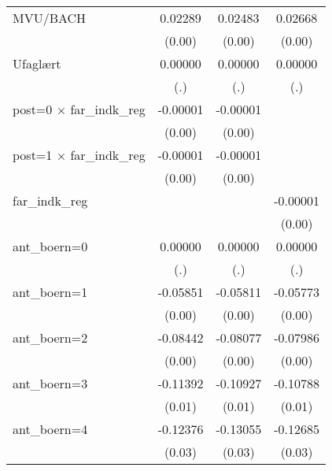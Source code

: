 \begin{table}[htbp]
\begin{tabular}{l*{3}{c}}
MVU/BACH            &     0.02289\sym{***}&     0.02483\sym{***}&     0.02668\sym{***}\\
                    &      (0.00)         &      (0.00)         &      (0.00)         \\
Ufaglært            &     0.00000         &     0.00000         &     0.00000         \\
                    &         (.)         &         (.)         &         (.)         \\
post=0 $\times$ far\_indk\_reg&    -0.00001\sym{*}  &    -0.00001\sym{*}  &                     \\
                    &      (0.00)         &      (0.00)         &                     \\
post=1 $\times$ far\_indk\_reg&    -0.00001\sym{*}  &    -0.00001\sym{**} &                     \\
                    &      (0.00)         &      (0.00)         &                     \\
far\_indk\_reg        &                     &                     &    -0.00001\sym{**} \\
                    &                     &                     &      (0.00)         \\
ant\_boern=0         &     0.00000         &     0.00000         &     0.00000         \\
                    &         (.)         &         (.)         &         (.)         \\
ant\_boern=1         &    -0.05851\sym{***}&    -0.05811\sym{***}&    -0.05773\sym{***}\\
                    &      (0.00)         &      (0.00)         &      (0.00)         \\
ant\_boern=2         &    -0.08442\sym{***}&    -0.08077\sym{***}&    -0.07986\sym{***}\\
                    &      (0.00)         &      (0.00)         &      (0.00)         \\
ant\_boern=3         &    -0.11392\sym{***}&    -0.10927\sym{***}&    -0.10788\sym{***}\\
                    &      (0.01)         &      (0.01)         &      (0.01)         \\
ant\_boern=4         &    -0.12376\sym{***}&    -0.13055\sym{***}&    -0.12685\sym{***}\\
                    &      (0.03)         &      (0.03)         &      (0.03)         \\

\end{tabular}
\end{table}
